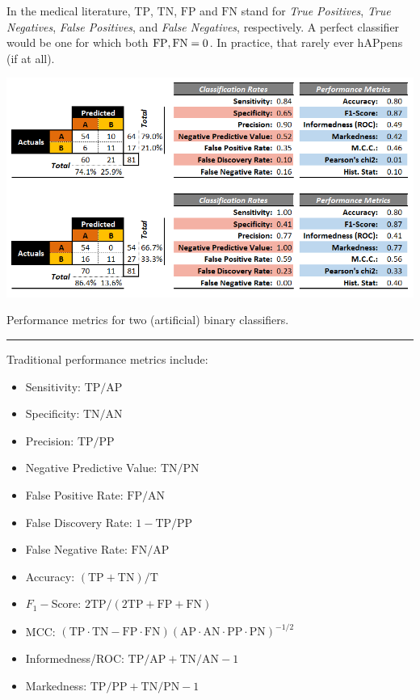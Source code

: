 In the medical literature, $\textrm{TP}$, $\textrm{TN}$, $\textrm{FP}$ and $\textrm{FN}$ stand for \textit{True Positives}, \textit{True Negatives}, \textit{False Positives}, and \textit{False Negatives}, respectively. A perfect classifier would be one for which both $\textrm{\textrm{FP}},\textrm{FN}=0$. In practice, that rarely ever h\textrm{AP}pens (if at all).\newpage\noindent \begin{table}[!t]
  \begin{center}
    \includegraphics[width=\textwidth]{images/DSML/Classification_Performance_Metrics}
  \end{center}
  \caption{\small Performance metrics for two (artificial) binary classifiers.}\hrule
  \label{tab:bin_perf_metrics}
\end{table}
Traditional performance metrics include: 
\begin{itemize}[noitemsep] \item {Sensitivity:} $\textrm{TP}/\textrm{AP}$ \item {Specificity:} $\textrm{TN}/\textrm{AN}$ \item {Precision:} $\textrm{TP}/\textrm{PP}$ \item {Negative Predictive Value:}   $\textrm{TN}/\textrm{PN}$ \item {False Positive Rate:} $\textrm{FP}/\textrm{AN}$ \item {False Discovery Rate:} $1-\textrm{TP}/\textrm{PP}$\item {False Negative Rate:} $\textrm{FN}/\textrm{AP}$ \item {Accuracy:} $(\textrm{TP}+\textrm{TN})/\textrm{T}$ \item {$F_1-$Score:} $2\textrm{TP}/(2\textrm{TP}+\textrm{FP}+\textrm{FN})$\item  {MCC:}  $(\textrm{TP}\cdot \textrm{TN}-\textrm{FP}\cdot \textrm{FN})(\textrm{AP}\cdot \textrm{AN}\cdot \textrm{PP} \cdot \textrm{PN})^{-1/2}$\item {Informedness/ROC:} $\textrm{TP}/\textrm{AP}+\textrm{TN}/\textrm{AN}-1$ \item {Markedness:} $\textrm{TP}/\textrm{PP}+\textrm{TN}/\textrm{PN}-1$
\end{itemize}  

